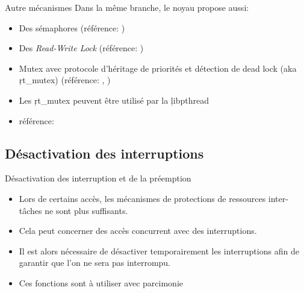 \begin{frame}[fragile=singleslide]{Autre mécanismes}
  Dans la même branche, le noyau propose aussi:
  \begin{itemize} 
  \item Des sémaphores (référence: )
  \item       Des       \emph{Read-Write       Lock}       (référence:
    )
  \item Mutex  avec protocole d'héritage de priorités  et détection de
    dead        lock       (aka        \c{rt_mutex})       (référence:
    , )
  \item Les \c{rt_mutex} peuvent être utilisé par la \c{libpthread}
  \item          référence:          
  \end{itemize} 
\end{frame} 

\subsection{Désactivation des interruptions}

\begin{frame}[fragile=singleslide]{Désactivation des interruption et de la préemption}
  \begin{itemize} 
  \item  Lors de  certains  accès, les  mécanismes  de protections  de
    ressources inter-tâches ne sont plus suffisants.
  \item   Cela  peut   concerner   des  accès   concurrent  avec   des
    interruptions.
  \item  Il  est alors  nécessaire  de  désactiver temporairement  les
    interruptions afin de garantir que l'on ne sera pas interrompu.
  \item Ces fonctions sont à utiliser avec parcimonie
  \end{itemize}
\end{frame}  

